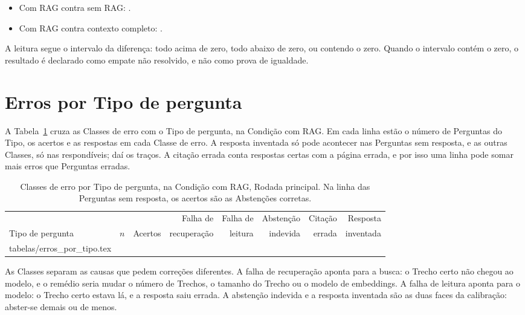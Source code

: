 \documentclass[11pt,a4paper]{article}
\makeatletter
\newenvironment{tabelaplena}
  {\begin{lrbox}{\tabelacaixa}}
  {\end{lrbox}\makebox[\linewidth][c]{\usebox{\tabelacaixa}}}
\newcommand{\linhasde}[1]{\@@input #1 }
\makeatother
\begin{document}
\begin{destaque}
  \begin{itemize}[leftmargin=*, itemsep=1pt, topsep=2pt]
    \item Com RAG contra sem RAG: \NumComRagXSemRagConclusao.
    \item Com RAG contra contexto completo: \NumComRagXContextoCompletoConclusao.
  \end{itemize}
  A leitura segue o intervalo da diferença: todo acima de zero, todo abaixo
  de zero, ou contendo o zero. Quando o intervalo contém o zero, o resultado
  é declarado como empate não resolvido, e não como prova de igualdade.
\end{destaque}

\section{Erros por Tipo de pergunta}

A Tabela~\ref{tab:erros} cruza as Classes de erro com o Tipo de pergunta,
na Condição com RAG. Em cada linha estão o número de Perguntas do Tipo, os
acertos e as respostas em cada Classe de erro. A resposta inventada só pode
acontecer nas Perguntas sem resposta, e as outras Classes, só nas
respondíveis; daí os traços. A citação errada conta respostas certas com a
página errada, e por isso uma linha pode somar mais erros que Perguntas
erradas.

\begin{table}[H]
  \centering
  \caption{Classes de erro por Tipo de pergunta, na Condição com RAG, Rodada
    principal. Na linha das Perguntas sem resposta, os acertos são as
    Abstenções corretas.}
  \label{tab:erros}
  \small
  \begin{tabelaplena}
  \begin{tabular}{@{}lrrrrrrr@{}}
    \toprule
    & & & Falha de & Falha de & Abstenção & Citação & Resposta \\
    Tipo de pergunta & $n$ & Acertos & recuperação & leitura & indevida & errada & inventada \\
    \midrule
    \linhasde{tabelas/erros_por_tipo.tex}
    \bottomrule
  \end{tabular}
  \end{tabelaplena}
\end{table}

As Classes separam as causas que pedem correções diferentes. A falha de
recuperação aponta para a busca: o Trecho certo não chegou ao modelo, e o
remédio seria mudar o número de Trechos, o tamanho do Trecho ou o modelo de
embeddings. A falha de leitura aponta para o modelo: o Trecho certo estava
lá, e a resposta saiu errada. A abstenção indevida e a resposta inventada
são as duas faces da calibração: abster-se demais ou de menos.
\end{document}
